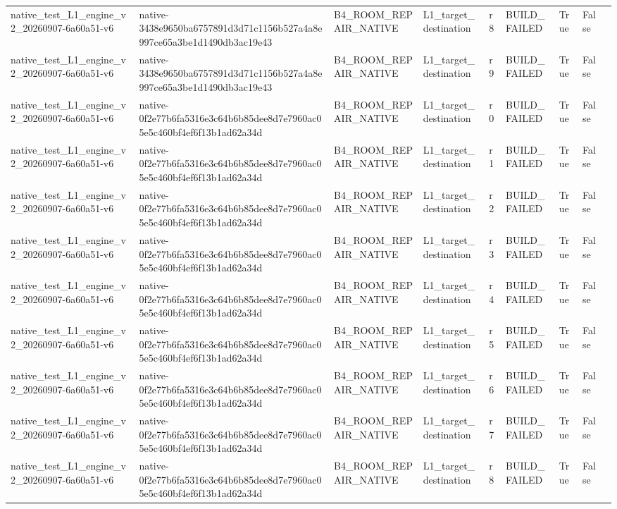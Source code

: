 \begin{tabular}{lllllllll}
native\_test\_L1\_engine\_v2\_20260907-6a60a51-v6 & native-3438e9650ba6757891d3d71c1156b527a4a8e997ce65a3be1d1490db3ac19e43 & B4\_ROOM\_REPAIR\_NATIVE & L1\_target\_destination & r8 & BUILD\_FAILED & True & False &  \\
native\_test\_L1\_engine\_v2\_20260907-6a60a51-v6 & native-3438e9650ba6757891d3d71c1156b527a4a8e997ce65a3be1d1490db3ac19e43 & B4\_ROOM\_REPAIR\_NATIVE & L1\_target\_destination & r9 & BUILD\_FAILED & True & False &  \\
native\_test\_L1\_engine\_v2\_20260907-6a60a51-v6 & native-0f2e77b6fa5316e3c64b6b85dee8d7e7960ac05e5c460bf4ef6f13b1ad62a34d & B4\_ROOM\_REPAIR\_NATIVE & L1\_target\_destination & r0 & BUILD\_FAILED & True & False &  \\
native\_test\_L1\_engine\_v2\_20260907-6a60a51-v6 & native-0f2e77b6fa5316e3c64b6b85dee8d7e7960ac05e5c460bf4ef6f13b1ad62a34d & B4\_ROOM\_REPAIR\_NATIVE & L1\_target\_destination & r1 & BUILD\_FAILED & True & False &  \\
native\_test\_L1\_engine\_v2\_20260907-6a60a51-v6 & native-0f2e77b6fa5316e3c64b6b85dee8d7e7960ac05e5c460bf4ef6f13b1ad62a34d & B4\_ROOM\_REPAIR\_NATIVE & L1\_target\_destination & r2 & BUILD\_FAILED & True & False &  \\
native\_test\_L1\_engine\_v2\_20260907-6a60a51-v6 & native-0f2e77b6fa5316e3c64b6b85dee8d7e7960ac05e5c460bf4ef6f13b1ad62a34d & B4\_ROOM\_REPAIR\_NATIVE & L1\_target\_destination & r3 & BUILD\_FAILED & True & False &  \\
native\_test\_L1\_engine\_v2\_20260907-6a60a51-v6 & native-0f2e77b6fa5316e3c64b6b85dee8d7e7960ac05e5c460bf4ef6f13b1ad62a34d & B4\_ROOM\_REPAIR\_NATIVE & L1\_target\_destination & r4 & BUILD\_FAILED & True & False &  \\
native\_test\_L1\_engine\_v2\_20260907-6a60a51-v6 & native-0f2e77b6fa5316e3c64b6b85dee8d7e7960ac05e5c460bf4ef6f13b1ad62a34d & B4\_ROOM\_REPAIR\_NATIVE & L1\_target\_destination & r5 & BUILD\_FAILED & True & False &  \\
native\_test\_L1\_engine\_v2\_20260907-6a60a51-v6 & native-0f2e77b6fa5316e3c64b6b85dee8d7e7960ac05e5c460bf4ef6f13b1ad62a34d & B4\_ROOM\_REPAIR\_NATIVE & L1\_target\_destination & r6 & BUILD\_FAILED & True & False &  \\
native\_test\_L1\_engine\_v2\_20260907-6a60a51-v6 & native-0f2e77b6fa5316e3c64b6b85dee8d7e7960ac05e5c460bf4ef6f13b1ad62a34d & B4\_ROOM\_REPAIR\_NATIVE & L1\_target\_destination & r7 & BUILD\_FAILED & True & False &  \\
native\_test\_L1\_engine\_v2\_20260907-6a60a51-v6 & native-0f2e77b6fa5316e3c64b6b85dee8d7e7960ac05e5c460bf4ef6f13b1ad62a34d & B4\_ROOM\_REPAIR\_NATIVE & L1\_target\_destination & r8 & BUILD\_FAILED & True & False &  \\

\end{tabular}

